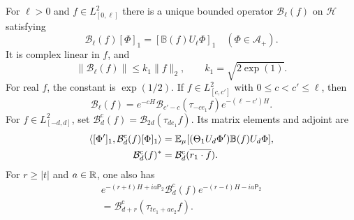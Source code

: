 \begin{proposition}\label{prop:rotation-insertion}
For $\ell>0$ and $f\in L^2_{[0,\ell]}$ there is a unique bounded
operator $\mathcal B_\ell(f)$ on $\mathcal H$ satisfying
\[
 \mathcal B_\ell(f)[\Phi]_1
       =[\mathbb B(f)U_\ell\Phi]_1\quad(\Phi\in\mathcal A_+).
\]
It is complex linear in $f$, and
\begin{equation}\label{eq:rotation-insertion-bound}
 \|\mathcal B_\ell(f)\|\le k_1\|f\|_2,\qquad
 k_1=\sqrt{2\exp(1)}.
\end{equation}
For real $f$, the constant is $\exp(1/2)$.
If $f\in L^2_{[c,c']}$ with $0\le c<c'\le\ell$, then
\begin{equation}\label{eq:rotation-insertion-local}
 \mathcal B_\ell(f)=e^{-cH}
       \mathcal B_{c'-c}(\tau_{-ce_1}f)e^{-(\ell-c')H}.
\end{equation}
For $f\in L^2_{[-d,d]}$, set
$\mathcal B_d^{\mathrm c}(f)=\mathcal B_{2d}(\tau_{de_1}f)$.
Its matrix elements and adjoint are
\begin{align}
 \langle[\Phi']_1,\mathcal B_d^{\mathrm c}(f)[\Phi]_1\rangle
   &=\mathbb E_\mu[(\Theta_1U_d\Phi')\mathbb B(f)U_d\Phi],
                         \label{eq:rotation-insertion-centered}\\
 \mathcal B_d^{\mathrm c}(f)^*
   &=\mathcal B_d^{\mathrm c}(\overline{r_1\cdot f}).\notag
\end{align}
For $r\ge|t|$ and $a\in\mathbb R$, one also has
\begin{multline}\label{eq:rotation-insertion-shift}
 e^{-(r+t)H+ia\mathsf P_2}\mathcal B_d^{\mathrm c}(f)
           e^{-(r-t)H-ia\mathsf P_2}\\
       =\mathcal B_{d+r}^{\mathrm c}(\tau_{te_1+ae_2}f).
\end{multline}
\end{proposition}

